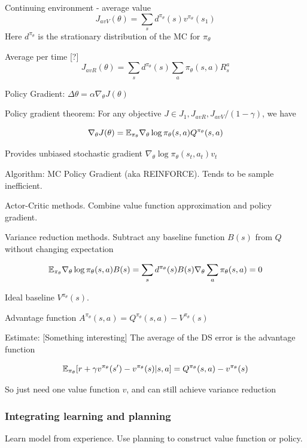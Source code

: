 \documentclass[english]{article}
\begin{document}
Continuing environment - average value 
$$J_{avV}(\theta) 
=
\sum_s d^{\pi_\theta}(s) v^{\pi_\theta}(s_1) 
$$
Here $d^{\pi_\theta}$ is the strationary distribution of the MC for $\pi_\theta$

Average per time [?]
$$J_{avR}(\theta) 
=
\sum_s d^{\pi_\theta}(s) \sum_a \pi_\theta(s,a) R^a_s 
$$

\item Policy Gradient: $\Delta \theta = \alpha \nabla_\theta J(\theta)$

Policy gradient theorem: For any objective $J\in J_1, J_{avR}, J_{avV}/(1-\gamma)$, we have

$$\nabla_\theta J(\theta) 
=
\mathbb{E}_{\pi_\theta} \nabla_\theta \log \pi_\theta(s,a)
Q^{\pi_\theta}(s,a)
$$ 

Provides unbiased stochastic gradient $\nabla_\theta \log \pi_\theta(s_t,a_t)v_t$

Algorithm: MC Policy Gradient (aka REINFORCE). Tends to be sample inefficient.

\item Actor-Critic methods. Combine value function approximation and policy gradient. 

\item Variance reduction methods. Subtract any baseline function $B(s)$ from $Q$ without changing expectation

$$
\mathbb{E}_{\pi_\theta} \nabla_\theta \log \pi_\theta(s,a)
B(s)
=
\sum_s d^{\pi_\theta}(s) B(s)\nabla_\theta  \sum_a \pi_\theta(s,a) =0
$$ 

Ideal baseline $V^{\pi_\theta}(s)$. 

Advantage function $A^{\pi_\theta}(s,a)=Q^{\pi_\theta}(s,a)-V^{\pi_\theta}(s)$

Estimate: [Something interesting] The average of the DS error is the advantage function

$$
\mathbb{E}_{\pi_\theta}
[r+\gamma v^{\pi_\theta}(s')-v^{\pi_\theta}(s)|s,a]
=
Q^{\pi_\theta}(s,a)- v^{\pi_\theta}(s)
$$ 

So just need one value function $v$, and can still achieve variance reduction




\eenum 




\subsubsection{Integrating learning and planning}
\benum

\item Learn model from experience. Use planning to construct value function or policy.
\end{document}
